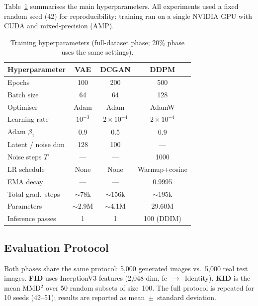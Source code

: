 \documentclass{llncs}
\begin{document}
Table~\ref{tab:hyperparams} summarises the main hyperparameters. All
experiments used a fixed random seed (42) for reproducibility; training
ran on a single NVIDIA GPU with CUDA and mixed-precision (AMP).

\begin{table}[!htbp]
\centering
\caption{Training hyperparameters (full-dataset phase; 20\% phase uses
         the same settings).}
\label{tab:hyperparams}
\begin{tabular}{lccc}
\toprule
\textbf{Hyperparameter} & \textbf{VAE} & \textbf{DCGAN} & \textbf{DDPM} \\
\midrule
Epochs              & 100   & 200    & 500 \\
Batch size          & 64    & 64     & 128 \\
Optimiser           & Adam  & Adam   & AdamW \\
Learning rate       & $10^{-3}$ & $2{\times}10^{-4}$ & $2{\times}10^{-4}$ \\
Adam $\beta_1$      & 0.9   & 0.5    & 0.9 \\
Latent / noise dim  & 128   & 100    & --- \\
Noise steps $T$     & ---   & ---    & 1000 \\
LR schedule         & None  & None   & Warmup+cosine \\
EMA decay           & ---   & ---    & 0.9995 \\
Total grad.\ steps  & $\sim$78k & $\sim$156k & $\sim$195k \\
Parameters          & $\sim$2.9M & $\sim$4.1M & 29.60M \\
Inference passes    & 1     & 1      & 100 (DDIM) \\
\bottomrule
\end{tabular}
\end{table}

\subsection{Evaluation Protocol}

Both phases share the same protocol: 5,000 generated images vs.\ 5,000
real test images. \textbf{FID} uses InceptionV3 features (2,048-dim,
fc~$\to$~Identity). \textbf{KID} is the mean MMD$^2$ over 50 random
subsets of size~100. The full protocol is repeated for 10 seeds (42--51);
results are reported as mean~$\pm$~standard deviation.

\end{document}
